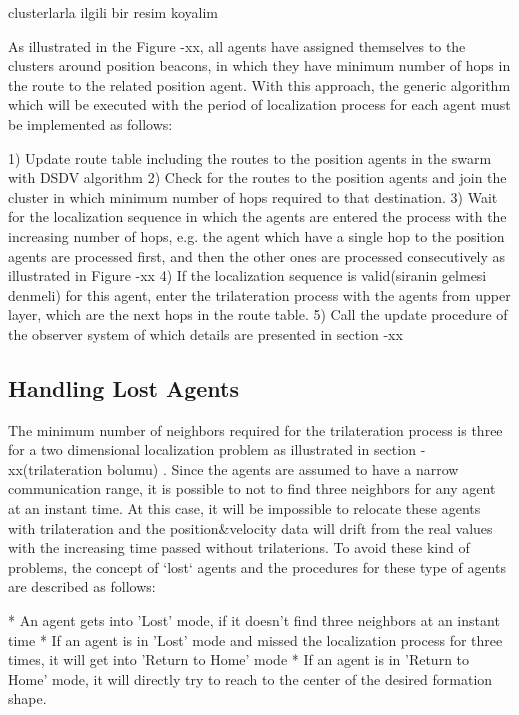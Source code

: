 \documentclass[twoside]{article}
\begin{document}
\begin{multicols}{2}
	clusterlarla ilgili bir resim koyalim
	
	As illustrated in the Figure -xx, all agents have assigned themselves to the clusters around position beacons, in which they have minimum number of hops in the route to the related position agent.  With this approach, the generic algorithm which will be executed with the period of localization process for each agent must be implemented as follows:
	
	1) Update route table including the routes to the position agents in the swarm with DSDV algorithm 
	2) Check for the routes to the position agents and join the cluster in which minimum number of hops required to that destination.
	3) Wait for the localization sequence in which the agents are entered the process with the increasing number of hops, e.g. the agent which have a single hop to the position agents are processed first, and then the other ones are processed consecutively as illustrated in Figure -xx
	4) If the localization sequence is valid(siranin gelmesi denmeli) for this agent, enter the trilateration process with the agents from upper layer,  which are the next hops in the route table.
	5) Call the update procedure of the observer system of which details are presented in section -xx
	
	\subsection{Handling Lost Agents}
	
	The minimum number of neighbors required for the trilateration process is three for a two dimensional localization problem as illustrated in section -xx(trilateration bolumu) . Since the agents are assumed to have a narrow communication range, it is possible to not to find three neighbors for any agent at an instant time. At this case, it will be impossible to relocate these agents with trilateration and the position$\&$velocity data will drift from the real values with the increasing time passed without trilaterions. To avoid these kind of problems, the concept of `lost` agents and the procedures for these type of agents are described as follows:
	
	* An agent gets into 'Lost' mode, if it doesn't find three neighbors at an instant time
	* If an agent is in 'Lost' mode and missed the localization process for three times, it will get into 'Return to Home' mode
	* If an agent is in 'Return to Home' mode, it will directly try to reach to the center of the desired formation shape.
	

\end{multicols}
\end{document}
